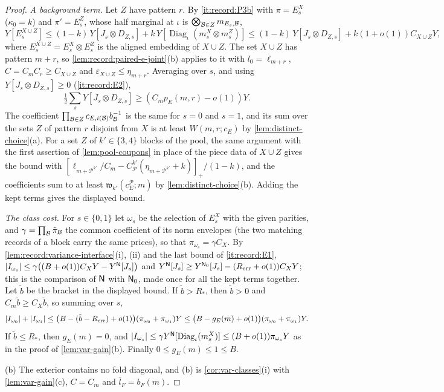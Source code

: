 \begin{proof}
\emph{A background term.} Let $Z$ have pattern $r$. By \ref{it:record:P3b} with
$\pi=E^X_s$ ($\kappa_0=k$) and $\pi'=E^Z_s$, whose half marginal at $\iota$ is
$\bigotimes_{\mathcal B\in Z}m_{E_s,\mathcal B}$,
\[
 Y[E^{X\cup Z}_s]\le(1-k)\,Y[J_s\otimes D_{Z,s}]+k\,Y[\operatorname{Diag}_\iota(
 m^X_s\otimes m^Z_s)]\le(1-k)\,Y[J_s\otimes D_{Z,s}]+k(1+o(1))C_{X\cup Z}Y,
\]
where $E^{X\cup Z}_s=E^X_s\otimes E^Z_s$ is the aligned embedding of $X\cup Z$. The
set $X\cup Z$ has pattern $m+r$, so \cref{lem:record:paired-e-joint}(b) applies to it
with $l_0=\ell_{m+r}$, $C=C_mC_r\ge C_{X\cup Z}$ and $\varepsilon_{X\cup Z}\le\eta_{m+r}$.
Averaging over $s$, and using $Y[J_s\otimes D_{Z,s}]\ge0$ (\ref{it:record:E2}),
\[
 \tfrac12\sum_sY[J_s\otimes D_{Z,s}]\ge(C_mp_E(m,r)-o(1))Y .
\]
The coefficient $\prod_{\mathcal B\in Z}c_{E,i(\mathcal B)}b_\mathcal B^{-1}$ is the same for $s=0$ and
$s=1$, and its sum over the sets $Z$ of pattern $r$ disjoint from $X$ is at least
$W(m,r;c_E)$ by \cref{lem:distinct-choice}(a). For a set $Z$ of $k'\in\{3,4\}$
blocks of the pool, the same argument with the first assertion of
\cref{lem:pool-coupons} in place of the piece data of $X\cup Z$ gives the bound
with
$[\ell_{m+\mathcal P^{k'}}/C_m-C_{\mathcal P}^{k'}(\eta_{m+\mathcal P^{k'}}+k)]_+/(1-k)$,
and the coefficients sum to at least $\mathfrak w_{k'}(c_E^{\mathcal P};m)$ by
\cref{lem:distinct-choice}(b). Adding the kept terms gives the displayed bound.

\emph{The class cost.} For $s\in\{0,1\}$ let $\omega_s$ be the selection of
$E^X_s$ with the given parities, and $\gamma=\prod_\mathcal B\tilde\pi_\mathcal B$ the common
coefficient of its norm envelopes (the two matching records of a block carry the
same prices), so that $\pi_{\omega_s}=\gamma C_X$. By
\cref{lem:record:variance-interface}(i), (ii) and the last bound of
\ref{it:record:E1},
$|I_{\omega_s}|\le\gamma\bigl((B+o(1))C_XY-Y^{\mathsf N}[J_s]\bigr)$ and
$Y^{\mathsf N}[J_s]\ge Y^{\mathsf N_0}[J_s]-(R_{\rm err}+o(1))C_XY$; this is the comparison
of $\mathsf N$ with $\mathsf N_0$, made once for all the kept terms together. Let $\tilde b$ be
the bracket in the displayed bound. If $\tilde b>R_*$, then $\tilde b>0$ and
$C_m\tilde b\ge C_X\tilde b$, so summing over $s$,
\[
 |I_{\omega_0}|+|I_{\omega_1}|\le\bigl(B-(\tilde b-R_{\rm err})+o(1)\bigr)
 (\pi_{\omega_0}+\pi_{\omega_1})Y\le\bigl(B-g_E(m)+o(1)\bigr)(\pi_{\omega_0}
 +\pi_{\omega_1})Y .
\]
If $\tilde b\le R_*$, then $g_E(m)=0$, and $|I_{\omega_s}|\le\gamma Y^{\mathsf N}[
\operatorname{Diag}_\iota(m^X_s)]\le(B+o(1))\pi_{\omega_s}Y$ as in the proof of
\cref{lem:var-gain}(b). Finally $0\le g_E(m)\le1\le B$.

(b) The exterior contains no fold diagonal, and (b) is \cref{cor:var-classes}(i)
with \cref{lem:var-gain}(c), $C=C_m$ and $\bar l_F=b_F(m)$.
\end{proof}

